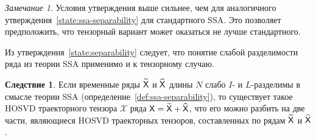 \documentclass[specialist,
    substylefile = spbu.rtx,
    subf,href,colorlinks=true, 12pt]{disser}
\theoremstyle{plain}
\theoremstyle{definition}
\newtheorem*{corollary}{Следствие}
\theoremstyle{remark}
\newtheorem*{remark}{Замечание}
\begin{document}
    \begin{remark}
        Условия утверждения выше сильнее, чем для аналогичного утверждения~\ref{state:ssa-separability}
        для стандартного SSA.
        Это позволяет предположить, что тензорный вариант может оказаться не лучше стандартного.
    \end{remark}

    Из утверждения~\ref{state:separability} следует, что понятие слабой разделимости ряда из теории SSA
    применимо и к тензорному случаю.
    \begin{corollary}
        Если временные ряды $\widetilde{\mathsf{X}}$ и $\widehat{\mathsf{X}}$ длины $N$ слабо $I$- и $L$-разделимы 
        в смысле теории SSA (определение~\ref{def:ssa-separability}),
        то существует такое HOSVD траекторного тензора $\mathcal{X}$ ряда 
        $\mathsf{X}=\widetilde{\mathsf{X}} + \widehat{\mathsf{X}}$, что его можно разбить
        на две части, являющиеся HOSVD траекторных тензоров, составленных по рядам 
        $\widetilde{\mathsf{X}}$ и $\widehat{\mathsf{X}}$.
    \end{corollary}
\end{document}
